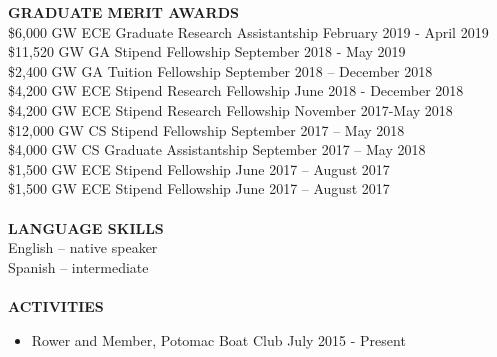\begin{singlespace}
\textbf{GRADUATE MERIT AWARDS}\\
\$6,000 GW ECE Graduate Research Assistantship      \hfill February 2019 - April 2019\\ 
\$11,520 GW GA Stipend Fellowship                   \hfill September 2018 - May 2019\\
\$2,400 GW GA Tuition Fellowship                    \hfill	September 2018 – December 2018\\
\$4,200 GW ECE Stipend Research Fellowship	        \hfill June 2018 - December 2018\\
\$4,200 GW ECE Stipend Research Fellowship	        \hfill November 2017-May 2018\\
\$12,000 GW CS Stipend Fellowship	                \hfill September 2017 – May 2018\\
\$4,000 GW CS Graduate Assistantship	            \hfill September 2017 – May 2018\\
\$1,500 GW ECE Stipend Fellowship                   \hfill June 2017 – August 2017\\
\$1,500 GW ECE Stipend Fellowship                   \hfill June 2017 – August 2017
\\\\
\textbf{LANGUAGE SKILLS}\\
English – native speaker\\	
Spanish – intermediate\\\\
\textbf{ACTIVITIES}\\
\begin{itemize}
	\item Rower and Member, Potomac Boat Club      \hfill July 2015 - Present  
\end{itemize}
\end{singlespace}
